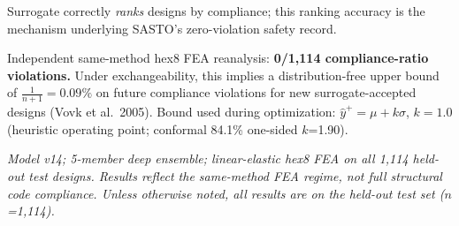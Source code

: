 \documentclass[10pt]{article}
\newenvironment{ccard}{%
  \begin{tcolorbox}[
    colback=cardfill, colframe=cardbdr,
    boxrule=0.5pt, arc=4pt, outer arc=4pt,
    left=3.5mm, right=3.5mm, top=2.5mm, bottom=2.5mm,
    width=\linewidth
  ]%
}{%
  \end{tcolorbox}%
}
\newcommand{\eqpill}[1]{%
  \begin{tcolorbox}[
    colback=eqbg, colframe=secbar,
    boxrule=0.6pt, arc=5pt,
    left=3mm, right=3mm, top=2mm, bottom=2mm,
    width=\linewidth
  ]
    \centering\small #1
  \end{tcolorbox}%
}
\newlength{\CC}  \setlength{\CC} {60.20cm}
\newlength{\TC}  \setlength{\TC} {19.33cm}
\begin{document}
\begin{minipage}[t]{\CC}
\begin{ccard}
\begin{minipage}[t]{\TC}
  \small\vspace{1mm}
  Surrogate correctly \textit{ranks} designs by compliance; this ranking
  accuracy is the mechanism underlying SASTO's zero-violation safety record.
\end{minipage}

\vspace{3mm}
\eqpill{%
  Independent same-method hex8 FEA reanalysis: \textbf{0/1,114
  compliance-ratio violations.} Under exchangeability, this implies a
  distribution-free upper bound of $\tfrac{1}{n+1}=0.09\%$ on future
  compliance violations for new surrogate-accepted designs (Vovk et al.\ 2005).
  Bound used during optimization: $\hat{y}^+ = \mu + k\sigma$,
  $k{=}1.0$ (heuristic operating point; conformal 84.1\% one-sided $k$=1.90).}
{\centering\tiny\itshape
  Model v14; 5-member deep ensemble; linear-elastic hex8 FEA on all 1,114
  held-out test designs. Results reflect the same-method FEA regime, not
  full structural code compliance. Unless otherwise noted, all results are
  on the held-out test set ($n$=1,114).\par}

\end{ccard}

\end{minipage}%
\hspace{3mm}%
\end{document}
